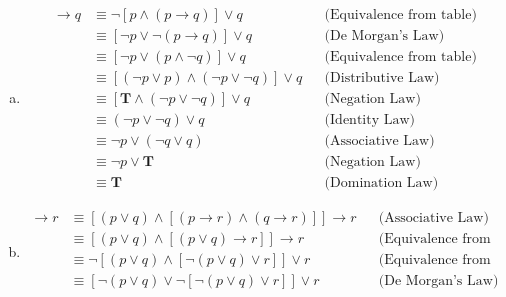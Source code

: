 \begin{itemize}
\begin{enumerate}[a.]
              \item \begin{align*}
                        [p \land (p \to q)] \to q
                         & \equiv \neg [p \land (p \to q)] \lor q                     &  & \text{(Equivalence from table)} \\
                         & \equiv [\neg p \lor \neg (p \to q)] \lor q                 &  & \text{(De Morgan’s Law)}        \\
                         & \equiv [\neg p \lor (p \land \neg q)] \lor q               &  & \text{(Equivalence from table)} \\
                         & \equiv [(\neg p \lor p) \land (\neg p \lor \neg q)] \lor q &  & \text{(Distributive Law)}       \\
                         & \equiv [\mathbf{T} \land (\neg p \lor \neg q)] \lor q      &  & \text{(Negation Law)}           \\
                         & \equiv (\neg p \lor \neg q) \lor q                         &  & \text{(Identity Law)}           \\
                         & \equiv \neg p \lor (\neg q \lor q)                         &  & \text{(Associative Law)}        \\
                         & \equiv \neg p \lor \mathbf{T}                              &  & \text{(Negation Law)}           \\
                         & \equiv \mathbf{T}                                          &  & \text{(Domination Law)}
                    \end{align*}
              \item \begin{align*}
                        [(p \lor q) \land (p \to r) \land (q \to r)] \to r
                         & \equiv [(p \lor q) \land [(p \to r) \land (q \to r)]] \to r                       &  & \text{(Associative Law)}               \\
                         & \equiv [(p \lor q) \land [(p \lor q) \to r]] \to r                                &  & \text{(Equivalence from table)}        \\
                         & \equiv \neg [(p \lor q) \land [\neg (p \lor q) \lor r]] \lor r                    &  & \text{(Equivalence from table)}        \\
                         & \equiv [\neg (p \lor q) \lor \neg[\neg (p \lor q) \lor r]] \lor r                 &  & \text{(De Morgan’s Law)}               \\

\end{align*}
\end{enumerate}
\end{itemize}
